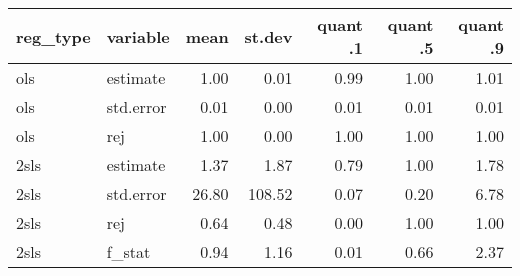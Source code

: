 \begin{tabular}{llrrrrr}
  \hline
reg\_type & variable & mean & st.dev & quant .1 & quant .5 & quant .9 \\ 
  \hline
ols & estimate & 1.00 & 0.01 & 0.99 & 1.00 & 1.01 \\ 
  ols & std.error & 0.01 & 0.00 & 0.01 & 0.01 & 0.01 \\ 
  ols & rej & 1.00 & 0.00 & 1.00 & 1.00 & 1.00 \\ 
  2sls & estimate & 1.37 & 1.87 & 0.79 & 1.00 & 1.78 \\ 
  2sls & std.error & 26.80 & 108.52 & 0.07 & 0.20 & 6.78 \\ 
  2sls & rej & 0.64 & 0.48 & 0.00 & 1.00 & 1.00 \\ 
  2sls & f\_stat & 0.94 & 1.16 & 0.01 & 0.66 & 2.37 \\ 
   \hline
\end{tabular}
